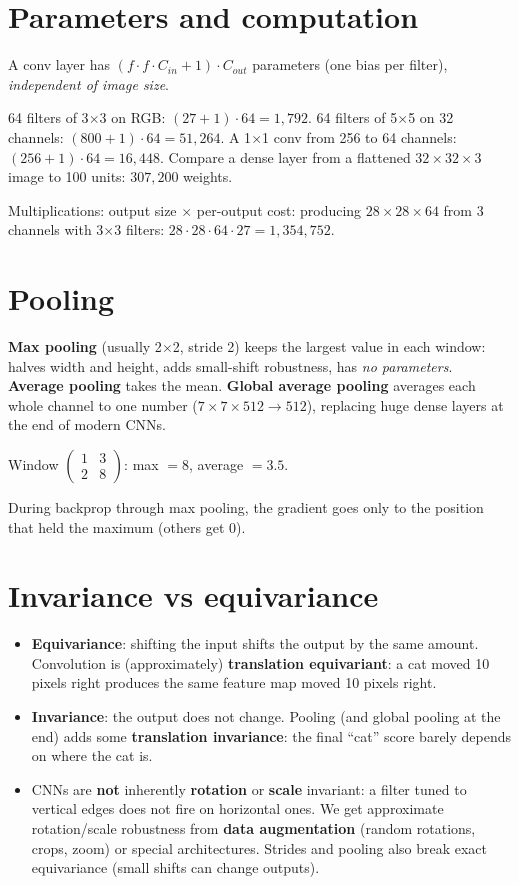 \section{Parameters and computation}
A conv layer has $(f\cdot f\cdot C_{in} + 1)\cdot C_{out}$ parameters (one bias per filter), \emph{independent of image size}.
\begin{example}
64 filters of 3$\times$3 on RGB: $(27 + 1)\cdot64 = 1{,}792$. 64 filters of 5$\times$5 on 32 channels: $(800 + 1)\cdot64 = 51{,}264$.
A 1$\times$1 conv from 256 to 64 channels: $(256 + 1)\cdot64 = 16{,}448$.
Compare a dense layer from a flattened $32\times32\times3$ image to 100 units: $307{,}200$ weights.
\end{example}
Multiplications: output size $\times$ per-output cost: producing $28\times28\times64$ from 3 channels with 3$\times$3 filters: $28\cdot28\cdot64\cdot27 = 1{,}354{,}752$.

\section{Pooling}
\textbf{Max pooling} (usually 2$\times$2, stride 2) keeps the largest value in each window: halves width and height, adds small-shift robustness, has
\emph{no parameters}. \textbf{Average pooling} takes the mean. \textbf{Global average pooling} averages each whole channel to one number
($7\times7\times512\to512$), replacing huge dense layers at the end of modern CNNs.
\begin{example}
Window $\begin{pmatrix}1&3\\2&8\end{pmatrix}$: max $= 8$, average $= 3.5$.
\end{example}
During backprop through max pooling, the gradient goes only to the position that held the maximum (others get 0).

\section{Invariance vs equivariance}
\begin{itemize}
\item \textbf{Equivariance}: shifting the input shifts the output by the same amount. Convolution is (approximately) \textbf{translation equivariant}:
  a cat moved 10 pixels right produces the same feature map moved 10 pixels right.
\item \textbf{Invariance}: the output does not change. Pooling (and global pooling at the end) adds some \textbf{translation invariance}: the final
  ``cat'' score barely depends on where the cat is.
\item CNNs are \textbf{not} inherently \textbf{rotation} or \textbf{scale} invariant: a filter tuned to vertical edges does not fire on horizontal ones.
  We get approximate rotation/scale robustness from \textbf{data augmentation} (random rotations, crops, zoom) or special architectures.
  Strides and pooling also break exact equivariance (small shifts can change outputs).
\end{itemize}

